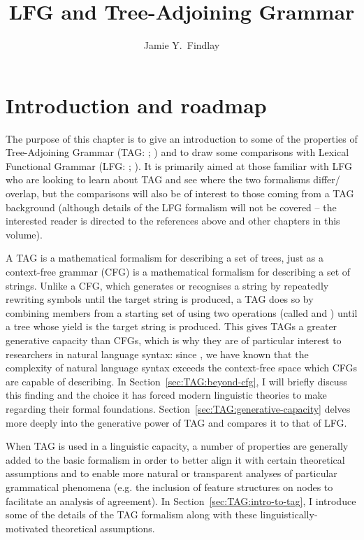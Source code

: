 \documentclass[output=paper,hidelinks]{langscibook}
\title{LFG and Tree-Adjoining Grammar}
\author{Jamie Y.\ Findlay\affiliation{University of Oslo}}
\begin{document}
\maketitle
\label{chap:TAG}

\section{Introduction and roadmap}
\label{sec:TAG:intro}

The purpose of this chapter is to give an introduction to some of the properties
of Tree-Adjoining Grammar (TAG:
\citealp{joshi-etal1975,joshi:tag-formal-hbk,abeille-rambow2000,joshi:tag-compling-hbk};
\citealp[ch.~4]{Kallmeyer2010}) and to draw some comparisons with Lexical
Functional Grammar (LFG: \citealp{kaplanbresnan82,BresnanEtAl2016,DLM:LFG};
). It is primarily aimed at those familiar with LFG who
are looking to learn about TAG and see where the two formalisms differ\slash
overlap, but the comparisons will also be of interest to those coming from a TAG
background (although details of the LFG formalism will not be covered -- the
interested reader is directed to the references above and other chapters in this
volume).

A TAG is a mathematical formalism for describing a set of trees, just as a
context-free grammar (CFG) is a mathematical formalism for describing a set of
strings. Unlike a CFG, which generates or recognises a string by repeatedly
rewriting symbols until the target string is produced, a TAG does so by
combining members from a starting set of  using two
operations (called  and ) until a tree whose
yield is the target string is produced. This gives TAGs a greater generative
capacity than CFGs, which is why they are of particular interest to researchers
in natural language syntax: since \citet{Shieber1985}, we have known that the
complexity of natural language syntax exceeds the context-free space which CFGs
are capable of describing. In Section~\ref{sec:TAG:beyond-cfg}, I will briefly
discuss this finding and the choice it has forced modern linguistic theories to
make regarding their formal foundations. Section~\ref{sec:TAG:generative-capacity}
delves more deeply into the generative power of TAG and compares it to that of LFG.

When TAG is used in a linguistic capacity, a number of properties are generally
added to the basic formalism in order to better align it with certain
theoretical assumptions and to enable more natural or transparent analyses of
particular grammatical phenomena (e.g. the inclusion of feature structures on
nodes to facilitate an analysis of agreement). In
Section~\ref{sec:TAG:intro-to-tag}, I introduce some of the details of the TAG
formalism along with these linguistically-motivated theoretical assumptions.
\end{document}

